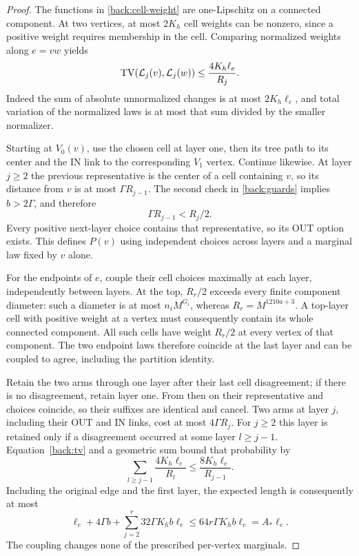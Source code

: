 \begin{proof}
The functions in \eqref{back:cell-weight} are one-Lipschitz on a
connected component.  At two vertices, at most $2K_h$ cell weights
can be nonzero, since a positive weight requires membership in the
cell.  Comparing normalized weights along $e=vw$ yields
\begin{equation}
\label{back:tv}
              \operatorname{TV}(\mathcal L_j(v),\mathcal L_j(w))
                        \le\frac{4K_h\ell_e}{R_j}.
\end{equation}
Indeed the sum of absolute unnormalized changes is at most
$2K_h\ell_e$, and total variation of the normalized laws is at most
that sum divided by the smaller normalizer.

Starting at $V_0(v)$, use the chosen cell at layer one, then its tree
path to its center and the IN link to the corresponding $V_1$ vertex.
Continue likewise.  At layer $j\ge2$ the previous representative is
the center of a cell containing $v$, so its distance from $v$ is at
most $\Gamma R_{j-1}$.  The second check in \eqref{back:guards} implies
$b>2\Gamma$, and therefore
\[
                  \Gamma R_{j-1}<R_j/2.
\]
Every positive next-layer choice contains that representative, so its
OUT option exists.  This defines $P(v)$ using independent choices
across layers and a marginal law fixed by $v$ alone.

For the endpoints of $e$, couple their cell choices maximally at each
layer, independently between layers.  At the top,
$R_r/2$ exceeds every finite component diameter: such a diameter is
at most $n_iM^{G_i}$, whereas $R_r=M^{1210a+3}$.
A top-layer cell with positive weight at a vertex must consequently
contain its whole connected component.  All such cells have weight
$R_r/2$ at every vertex of that component.  The two endpoint laws
therefore coincide at the last layer and can be coupled to agree,
including the partition identity.

Retain the two arms through one layer after their last cell
disagreement; if there is no disagreement, retain layer one.  From
then on their representative and choices coincide, so their suffixes
are identical and cancel.  Two arms at layer $j$, including their
OUT and IN links, cost at most $4\Gamma R_j$.  For $j\ge2$ this layer
is retained only if a disagreement occurred at some layer $l\ge j-1$.
Equation~\eqref{back:tv} and a geometric sum bound that probability by
\[
       \sum_{l\ge j-1}\frac{4K_h\ell_e}{R_l}
                         \le\frac{8K_h\ell_e}{R_{j-1}}.
\]
Including the original edge and the first layer, the expected length
is consequently at most
\[
 \ell_e+4\Gamma b+
       \sum_{j=2}^r32\Gamma K_hb\ell_e
                   \le64r\Gamma K_hb\ell_e=A_*\ell_e.
\]
The coupling changes none of the prescribed per-vertex marginals.
\end{proof}

